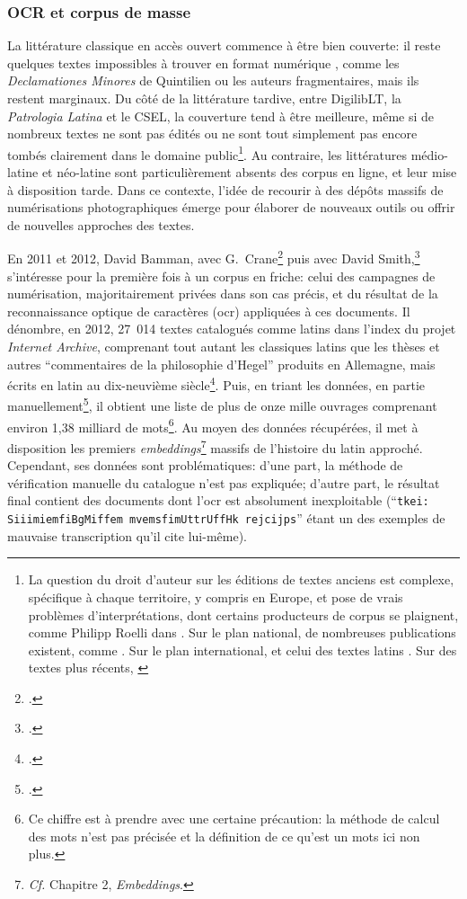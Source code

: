 \subsubsection{OCR et corpus de masse}

La littérature classique en accès ouvert commence à être bien couverte: il reste quelques textes impossibles à trouver en format numérique , comme les \textit{Declamationes Minores} de Quintilien ou les auteurs fragmentaires, mais ils restent marginaux. Du côté de la littérature tardive, entre DigilibLT, la \textit{Patrologia Latina} et le CSEL, la couverture tend à être meilleure, même si de nombreux textes ne sont pas édités ou ne sont tout simplement pas encore tombés clairement dans le domaine public\footnote{La question du droit d'auteur sur les éditions de textes anciens est complexe, spécifique à chaque territoire, y compris en Europe, et pose de vrais problèmes d'interprétations, dont certains producteurs de corpus se plaignent, comme Philipp Roelli dans \cite{roelli2014corpus}. Sur le plan national, de nombreuses publications existent, comme \cite{combalbert_lediteur_2015, demonet_confiscation_2018}. Sur le plan international, et celui des textes latins \cite{fischer2017digital, dillen_digital_2016}. Sur des textes plus récents, \cite{dusollier_international_2019}}. Au contraire, les littératures médio-latine et néo-latine sont particulièrement absents des corpus en ligne, et leur mise à disposition tarde. Dans ce contexte, l'idée de recourir à des dépôts massifs de numérisations photographiques émerge pour élaborer de nouveaux outils ou offrir de nouvelles approches des textes.

En 2011 et 2012, David Bamman, avec G.~Crane\footcite{Bamman:2011:MHW:1998076.1998078} puis avec David Smith,\footcite{bamman_extracting_2012} s'intéresse pour la première fois à un corpus en friche: celui des campagnes de numérisation, majoritairement privées dans son cas précis, et du résultat de la reconnaissance optique de caractères (\acrshort{ocr}) appliquées à ces documents. Il dénombre, en 2012, 27~014 textes catalogués comme latins dans l'index du projet \textit{Internet Archive}, comprenant tout autant les classiques latins que les thèses et autres ``commentaires de la philosophie d'Hegel'' produits en Allemagne, mais écrits en latin au dix-neuvième siècle\footcite{bamman_extracting_2012}. Puis, en triant les données, en partie manuellement\footcite{bamman_dbammanlatintexts_2018}, il obtient une liste de plus de onze mille ouvrages comprenant environ 1,38 milliard de mots\footnote{Ce chiffre est à prendre avec une certaine précaution: la méthode de calcul des mots n'est pas précisée et la définition de ce qu'est un mots ici non plus.}. Au moyen des données récupérées, il met à disposition les premiers \textit{embeddings}\footnote{\textit{Cf.} Chapitre 2, \textit{Embeddings}.} massifs de l'histoire du latin approché. Cependant, ses données sont problématiques: d'une part, la méthode de vérification manuelle du catalogue n'est pas expliquée; d'autre part, le résultat final contient des documents dont l'\acrshort{ocr} est absolument inexploitable (``\texttt{tkei: SiiimiemfiBgMiffem mvemsfimUttrUffHk rejcijps}'' étant un des exemples de mauvaise transcription qu'il cite lui-même).


